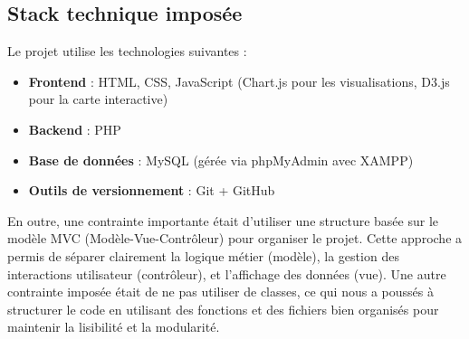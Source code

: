 \documentclass[11pt]{article}
\begin{document}
\subsection*{Stack technique imposée}
Le projet utilise les technologies suivantes :
\begin{itemize}
  \item \textbf{Frontend} : HTML, CSS, JavaScript (Chart.js pour les visualisations, D3.js pour la carte interactive)
  \item \textbf{Backend} : PHP
  \item \textbf{Base de données} : MySQL (gérée via phpMyAdmin avec XAMPP)
  \item \textbf{Outils de versionnement} : Git + GitHub
\end{itemize}

En outre, une contrainte importante était d'utiliser une structure basée sur le modèle MVC (Modèle-Vue-Contrôleur) pour organiser le projet. Cette approche a permis de séparer clairement la logique métier (modèle), la gestion des interactions utilisateur (contrôleur), et l'affichage des données (vue). Une autre contrainte imposée était de ne pas utiliser de classes, ce qui nous a poussés à structurer le code en utilisant des fonctions et des fichiers bien organisés pour maintenir la lisibilité et la modularité.

\newpage
\end{document}
